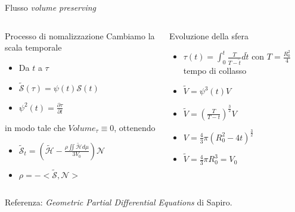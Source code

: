 \begin{frame}{Flusso \emph{volume preserving}}
  \begin{columns}[T]
    \begin{column}{6cm}
      \begin{block}{Processo di nomalizzazione}
        Cambiamo la scala temporale
        \begin{itemize}
        \item Da $t$ a $\tau$
        \item $\mathcal{\tilde{S}(\tau)}=\psi(t)\mathcal{S}(t)$ 
        \item $\psi^2(t)=\frac{\partial\tau}{\partial t}$
        \end{itemize}
         in modo tale che \alert{$Volume_{\tau}\equiv 0$}, ottenendo   
         \begin{itemize}
         \item $\mathcal{\tilde{S}}_t=\left(\mathcal{\tilde{H}}-\frac{\rho\iint\mathcal{\tilde{H}}d\mu}{3V_0}\right)\mathcal{N}$
         \item $\rho =-<\mathcal{\tilde{S}},\mathcal{N}>$
         \end{itemize}
      \end{block}
    \end{column}
    \begin{column}[T]{4cm}
      \begin{exampleblock}{Evoluzione della sfera}
        \begin{itemize}
        \item $\tau(t)=\int_0^t\frac{T}{T-\tilde{t}}d\tilde{t}$ con
          $T=\frac{R_0^2}{4}$ tempo di 
          collasso
        \item $\tilde{V}=\psi^3(t)V$
        \item $\tilde{V}=\left(\frac{T}{T-t}\right)^{\frac{3}{2}}V$
        \item $V=\frac{4}{3}\pi(R_0^2-4t)^{\frac{3}{2}}$
        \item $\tilde{V}=\frac{4}{3}\pi R_0^3=V_0$
        \end{itemize}
      \end{exampleblock}
    \end{column}
  \end{columns}
Referenza: \emph{Geometric Partial Differential Equations} di Sapiro.
\end{frame}
